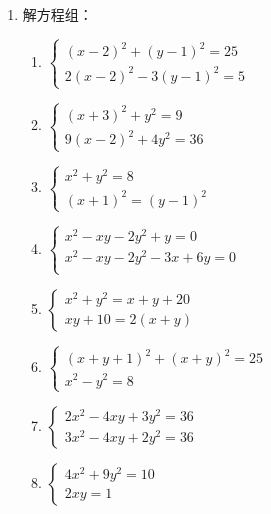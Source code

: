 \begin{enumerate}
\item 解方程组：
\begin{multicols}{2}
\begin{enumerate}
    \item $\begin{cases}
        (x-2)^2+(y-1)^2=25\\
        2(x-2)^2-3(y-1)^2=5
    \end{cases}$
    \item $\begin{cases}
        (x+3)^2+y^2=9\\
        9(x-2)^2+4y^2=36
    \end{cases}$
    \item $\begin{cases}
        x^2+y^2=8\\
        (x+1)^2=(y-1)^2
    \end{cases}$
    \item $\begin{cases}
        x^2-xy-2y^2+y=0\\
        x^2-xy-2y^2-3x+6y=0\\
    \end{cases}$
    \item $\begin{cases}
        x^2+y^2=x+y+20\\
        xy+10=2(x+y)
    \end{cases}$
    \item $\begin{cases}
        (x+y+1)^2+(x+y)^2=25\\
        x^2-y^2=8
    \end{cases}$
    \item $\begin{cases}
        2x^2-4xy+3y^2=36\\
        3x^2-4xy+2y^2=36
    \end{cases}$
    \item $\begin{cases}
        4x^2+9y^2=10\\
        2xy=1
    \end{cases}$
\end{enumerate}    
\end{multicols}


\end{enumerate}
